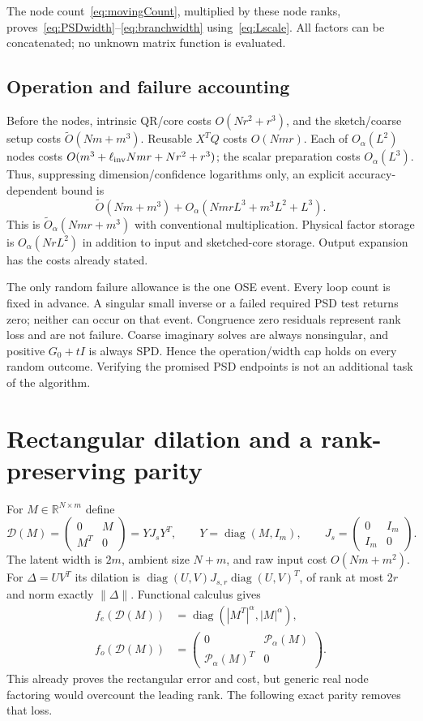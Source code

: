 \documentclass[11pt]{article}
\numberwithin{equation}{section}
\newcommand{\R}{\mathbb R}
\newcommand{\diag}{\operatorname{diag}}
\begin{document}
The node count~\eqref{eq:movingCount}, multiplied by these node ranks,
proves~\eqref{eq:PSDwidth}--\eqref{eq:branchwidth} using~\eqref{eq:Lscale}.
All factors can be concatenated; no unknown matrix function is evaluated.

\subsection*{Operation and failure accounting}
Before the nodes, intrinsic QR/core costs $O(Nr^2+r^3)$, and the
sketch/coarse setup costs $\widetilde O(Nm+m^3)$. Reusable $X^TQ$
costs $O(Nmr)$. Each of $O_\alpha(L^2)$ nodes costs
$O(m^3+\ell_{\rm inv}Nmr+Nr^2+r^3)$; the scalar preparation costs
$O_\alpha(L^3)$. Thus, suppressing dimension/confidence logarithms only,
an explicit accuracy-dependent bound is
\[
 \widetilde O(Nm+m^3)+O_\alpha(NmrL^3+m^3L^2+L^3).
\]
This is $\widetilde O_\alpha(Nmr+m^3)$ with conventional multiplication.
Physical factor storage is $O_\alpha(NrL^2)$ in addition to input and
sketched-core storage. Output expansion has the costs already stated.

The only random failure allowance is the one OSE event. Every loop
count is fixed in advance. A singular small inverse or a failed required
PSD test returns zero; neither can occur on that event. Congruence zero
residuals represent rank loss and are not failure. Coarse imaginary
solves are always nonsingular, and positive $G_0+tI$ is always SPD.
Hence the operation/width cap holds on every random outcome. Verifying
the promised PSD endpoints is not an additional task of the algorithm.

\section{Rectangular dilation and a rank-preserving parity}

For $M\in\R^{N\times m}$ define
\[
 \mathcal D(M)=\begin{pmatrix}0&M\\M^T&0\end{pmatrix}
       =YJ_sY^T,\qquad
 Y=\diag(M,I_m),\qquad J_s=\begin{pmatrix}0&I_m\\I_m&0\end{pmatrix}.
\]
The latent width is $2m$, ambient size $N+m$, and raw input cost
$O(Nm+m^2)$. For $\Delta=UV^T$ its dilation is
$\diag(U,V)J_{s,r}\diag(U,V)^T$, of rank at most $2r$ and norm
exactly $\|\Delta\|$. Functional calculus gives
\begin{align*}
 f_e(\mathcal D(M))&=\diag(|M^T|^\alpha,|M|^\alpha),\\
 f_o(\mathcal D(M))&=
 \begin{pmatrix}0&\mathcal P_\alpha(M)\\
                 \mathcal P_\alpha(M)^T&0\end{pmatrix}.
\end{align*}
This already proves the rectangular error and cost, but generic real
node factoring would overcount the leading rank. The following exact
parity removes that loss.
\end{document}
